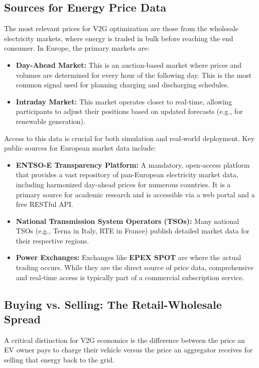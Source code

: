 \subsection{Sources for Energy Price Data}
The most relevant prices for V2G optimization are those from the wholesale electricity markets, where energy is traded in bulk before reaching the end consumer. In Europe, the primary markets are:
\begin{itemize}
    \item \textbf{Day-Ahead Market:} This is an auction-based market where prices and volumes are determined for every hour of the following day. This is the most common signal used for planning charging and discharging schedules.
    \item \textbf{Intraday Market:} This market operates closer to real-time, allowing participants to adjust their positions based on updated forecasts (e.g., for renewable generation).
\end{itemize}
Access to this data is crucial for both simulation and real-world deployment. Key public sources for European market data include:
\begin{itemize}
    \item \textbf{ENTSO-E Transparency Platform:} A mandatory, open-access platform that provides a vast repository of pan-European electricity market data, including harmonized day-ahead prices for numerous countries. It is a primary source for academic research and is accessible via a web portal and a free RESTful API.
    \item \textbf{National Transmission System Operators (TSOs):} Many national TSOs (e.g., Terna in Italy, RTE in France) publish detailed market data for their respective regions.
    \item \textbf{Power Exchanges:} Exchanges like \textbf{EPEX SPOT} are where the actual trading occurs. While they are the direct source of price data, comprehensive and real-time access is typically part of a commercial subscription service.
\end{itemize}

\subsection{Buying vs. Selling: The Retail-Wholesale Spread}
A critical distinction for V2G economics is the difference between the price an EV owner pays to charge their vehicle versus the price an aggregator receives for selling that energy back to the grid.

